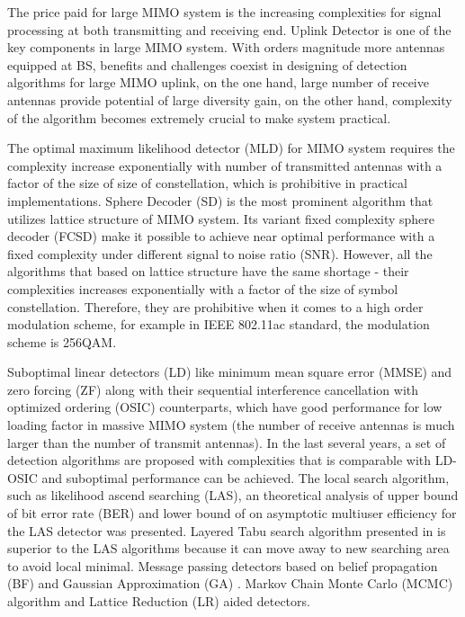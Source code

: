 \documentclass[12pt, draftclsnofoot, onecolumn]{IEEEtran}
\begin{document}
\begin{spacing}{2}
  The price paid for large MIMO system is the increasing complexities for signal processing at both transmitting and receiving end. Uplink Detector is one of the key components in large MIMO system. With orders magnitude more antennas equipped at BS, benefits and challenges coexist in designing of detection algorithms for large MIMO uplink, on the one hand, large number of receive antennas provide potential of large diversity gain, on the other hand, complexity of the algorithm becomes extremely crucial to make system practical. 
  
The optimal maximum likelihood detector (MLD) for MIMO system requires the complexity increase exponentially with number of transmitted antennas with a factor of the size of size of constellation, which is prohibitive in practical implementations. 
Sphere Decoder (SD)\cite{damen2003maximum} is the most prominent algorithm that utilizes lattice structure of MIMO system. 
Its variant fixed complexity sphere decoder (FCSD)\cite{barbero2008fixing} make it possible to achieve near optimal performance with a fixed complexity under different signal to noise ratio (SNR). However, all the algorithms that based on lattice structure have the same shortage - their complexities increases exponentially with a factor of the size of symbol constellation. Therefore, they are prohibitive when it comes to a high order modulation scheme, for example in IEEE 802.11ac standard\cite{IEEE802.11ac}, the modulation scheme is 256QAM. 
 
Suboptimal linear detectors (LD) like minimum mean square error (MMSE) and zero forcing (ZF) along with their sequential interference cancellation with optimized ordering (OSIC) counterparts\cite{wolniansky1998v}\cite{foschini1999simplified}\cite{benesty2003fast}, which have good performance for low loading factor in massive MIMO system (the number of receive antennas is much larger than the number of transmit antennas)\cite{hoydis2013massive}. In the last several years, a set of detection algorithms are proposed with complexities that is comparable with LD-OSIC and suboptimal performance can be achieved.  The local search algorithm, such as likelihood ascend searching (LAS)\cite{vardhan2008low}\cite{li2010multiple}, an theoretical analysis of upper bound of bit error rate (BER) and lower bound of on asymptotic multiuser efficiency for the LAS detector was presented\cite{sunfamily}. Layered Tabu search algorithm presented in\cite{srinidhi2011layered} is superior to the LAS algorithms because it can move away to new searching area to avoid local minimal. Message passing detectors based on belief propagation (BF) and Gaussian Approximation (GA) \cite{goldberger2011mimo}\cite{som2011low}\cite{narasimhan2014channel}\cite{som2010improved}. Markov Chain Monte Carlo (MCMC) algorithm\cite{datta2013novel}  and Lattice Reduction (LR) aided detectors\cite{zhou2013element}.


\end{spacing}
\end{document}
